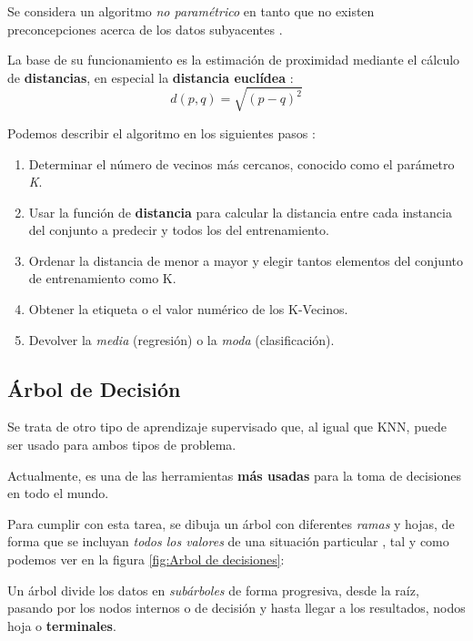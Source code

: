 Se considera un algoritmo \textit{no paramétrico} en tanto que no existen preconcepciones acerca de los datos subyacentes \cite{Belyadi2021SupervisedLearning}.

La base de su funcionamiento es la estimación de proximidad mediante el cálculo de \textbf{distancias}, en especial la \textbf{distancia euclídea} \cite{Greenacre2009CorrespondenceAnalysis}:
\begin{equation}
    d(p,q) = \sqrt{(p-q)^2}
\end{equation}

Podemos describir el algoritmo en los siguientes pasos \cite{Almomany2022OptimizedStudy}: 
\begin{enumerate}
    \item Determinar el número de vecinos más cercanos, conocido como el parámetro \textit{K}.
    \item Usar la función de \textbf{distancia} para calcular la distancia entre cada instancia del conjunto a predecir y todos los del entrenamiento.
    \item Ordenar la distancia de menor a mayor y elegir tantos elementos del conjunto de entrenamiento como K.
    \item Obtener la etiqueta o el valor numérico de los K-Vecinos.
    \item Devolver la \textit{media} (regresión) o la \textit{moda} (clasificación).
\end{enumerate}


\subsection{Árbol de Decisión}

Se trata de otro tipo de aprendizaje supervisado que, al igual que KNN, puede ser usado para ambos tipos de problema.

Actualmente, es una de las herramientas \textbf{más usadas} para la toma de decisiones \cite{Navada2011OverviewLearning} en todo el mundo.

Para cumplir con esta tarea, se dibuja un árbol con diferentes \textit{ramas} y hojas, de forma que se incluyan \textit{todos los valores} de una situación particular \cite{Navada2011OverviewLearning}, tal y como podemos ver en la figura \ref{fig:Arbol de decisiones}:


Un árbol divide los datos en \textit{subárboles} de forma progresiva, desde la raíz, pasando por los nodos internos o de decisión y hasta llegar a los resultados, nodos hoja o \textbf{terminales}.

